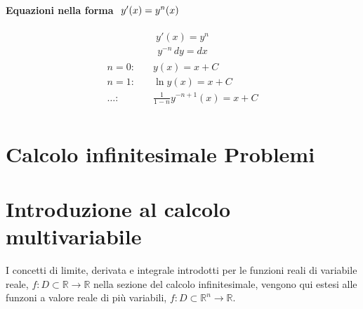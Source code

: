 \documentclass[letterpaper,10pt,italian]{jupyterBook}
\begin{document}
\subsubsection*{Equazioni nella forma \protect\(\ y'(x) = y^n(x)\protect\)}
\begin{equation*}
\begin{split}y'(x) = y^n\end{split}
\end{equation*}\begin{equation*}
\begin{split}y^{-n} \, dy = dx\end{split}
\end{equation*}\begin{equation*}
\begin{split}\begin{aligned}
 n = 0: & \quad  y(x) = x + C \\
 n = 1: & \quad  \ln y(x) = x + C \\
 \dots: & \quad  \frac{1}{1-n} y^{-n+1}(x) = x + C  \\
\end{aligned}\end{split}
\end{equation*}
\sphinxstepscope


\chapter{Calcolo infinitesimale \sphinxhyphen{} Problemi}
\label{\detokenize{ch/infinitesimal_calculus/problems:calcolo-infinitesimale-problemi}}\label{\detokenize{ch/infinitesimal_calculus/problems:infinitesimal-calculus-problems}}\label{\detokenize{ch/infinitesimal_calculus/problems::doc}}
\sphinxAtStartPar
{} 

\sphinxstepscope


\chapter{Introduzione al calcolo multi\sphinxhyphen{}variabile}
\label{\detokenize{ch/multivariable-calculus:introduzione-al-calcolo-multi-variabile}}\label{\detokenize{ch/multivariable-calculus:multivariable-calculus}}\label{\detokenize{ch/multivariable-calculus::doc}}
\sphinxAtStartPar
I concetti di limite, derivata e integrale introdotti per le funzioni reali di variabile reale, \(f: D \subset \mathbb{R} \rightarrow \mathbb{R}\) nella sezione del calcolo infinitesimale, vengono qui estesi alle funzoni a valore reale di più variabili, \(f: D \subset \mathbb{R}^n \rightarrow \mathbb{R}\).
\end{document}
